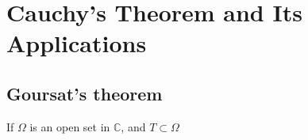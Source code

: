 \chapter{Cauchy's Theorem and Its Applications}

\section{Goursat's theorem}

\begin{theorem}
    If $\Omega$ is an open set in $\mathbb{C}$, and $T\subset \Omega$
\end{theorem}

